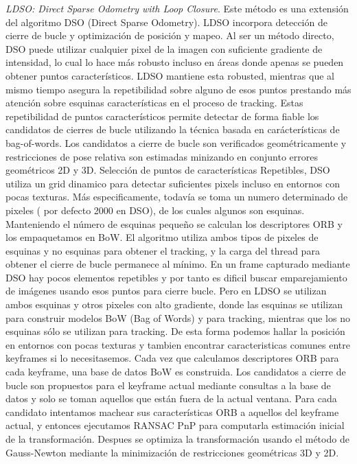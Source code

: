 \textit{LDSO: Direct Sparse Odometry with Loop Closure}. Este método es una extensión del algoritmo DSO (Direct Sparse Odometry). LDSO incorpora detección de cierre de bucle y optimización de posición y mapeo. Al ser un método directo, DSO puede utilizar cualquier pixel de la imagen con suficiente gradiente de intensidad, lo cual lo hace más robusto incluso en áreas donde apenas se pueden obtener puntos característicos. LDSO mantiene esta robusted, mientras que al mismo tiempo asegura la repetibilidad  sobre alguno de esos puntos prestando más atención sobre esquinas características en el proceso de tracking. Estas repetibilidad de puntos característicos permite detectar de forma fiable los candidatos de cierres de bucle utilizando la técnica basada en carácterísticas de bag-of-words. 
Los candidatos a cierre de bucle son verificados geométricamente y restricciones de pose relativa son estimadas minizando en conjunto errores geométricos 2D y 3D.
Selección de puntos de características Repetibles, DSO utiliza un grid dinamico para detectar suficientes pixels incluso en entornos con pocas texturas. Más especificamente, todavía se toma un numero determinado de pixeles ( por defecto 2000 en DSO), de los cuales algunos son esquinas. Manteniendo el número de esquinas pequeño se calculan los descriptores ORB y los empaquetamos en BoW. El algoritmo  utiliza ambos tipos de pixeles de esquinas y no esquinas para obtener el tracking, y la carga del thread para obtener el cierre de bucle permanece al mínimo.
En un frame capturado mediante DSO hay pocos elementos repetibles y por tanto es dificil buscar emparejamiento de imágenes usando esos puntos para cierre bucle. Pero en LDSO se utilizan ambos esquinas y otros pixeles con alto gradiente, donde las esquinas se utilizan para construir modelos BoW (Bag of Words) y para tracking, mientras que los no esquinas sólo se utilizan para tracking. De esta forma podemos hallar la posición en entornos con pocas texturas y tambien encontrar caracteristicas comunes entre keyframes si lo necesitasemos.
Cada vez que calculamos descriptores ORB para cada keyframe, una base de datos BoW es construida. Los candidatos a cierre de bucle son propuestos para el keyframe actual mediante consultas a la base de datos y solo se toman aquellos que están fuera de la actual ventana. Para cada candidato intentamos machear sus características ORB a aquellos del keyframe actual, y entonces ejecutamos RANSAC PnP para computarla estimación inicial de la transformación. Despues se optimiza la transformación usando el método de Gauss-Newton mediante la minimización de restricciones geométricas 3D y 2D.

